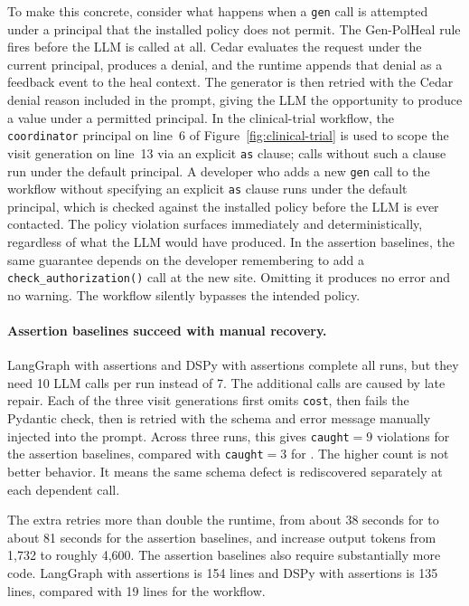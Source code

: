 To make this concrete, consider what happens when a \texttt{gen} 
call is attempted under a principal that the installed policy does 
not permit. The Gen-PolHeal rule fires before the LLM is called 
at all. Cedar evaluates the request under the current principal, 
produces a denial, and the runtime appends that denial as a 
feedback event to the heal context. The generator is then retried 
with the Cedar denial reason included in the prompt, giving the 
LLM the opportunity to produce a value under a permitted 
principal. In the clinical-trial workflow, the
\texttt{coordinator} principal on line~6 of
Figure~\ref{fig:clinical-trial} is used to scope the visit
generation on line~13 via an explicit \texttt{as} clause; calls
without such a clause run under the default principal. A developer
who adds a new \texttt{gen} call to
the workflow without specifying an explicit \texttt{as} clause 
runs under the default principal, which is checked against the 
installed policy before the LLM is ever contacted. The policy 
violation surfaces immediately and deterministically, regardless 
of what the LLM would have produced. In the assertion baselines, 
the same guarantee depends on the developer remembering to add a 
\texttt{check\_authorization()} call at the new site. Omitting it 
produces no error and no warning. The workflow silently bypasses 
the intended policy.

\paragraph{Assertion baselines succeed with manual recovery.}
LangGraph with assertions and DSPy with assertions complete all runs,
but they need 10 LLM calls per run instead of 7. The additional calls
are caused by late repair. Each of the three visit generations first
omits \texttt{cost}, then fails the Pydantic check, then is retried with
the schema and error message manually injected into the prompt. Across
three runs, this gives \texttt{caught}$=9$ violations for the assertion
baselines, compared with \texttt{caught}$=3$ for \pact{}. The higher
count is not better behavior. It means the same schema defect is
rediscovered separately at each dependent call.

The extra retries more than double the runtime, from about 38 seconds
for \pact{} to about 81 seconds for the assertion baselines, and
increase output tokens from 1{,}732 to roughly 4{,}600. The assertion
baselines also require substantially more code. LangGraph with
assertions is 154 lines and DSPy with assertions is 135 lines, compared
with 19 lines for the \pact{} workflow.